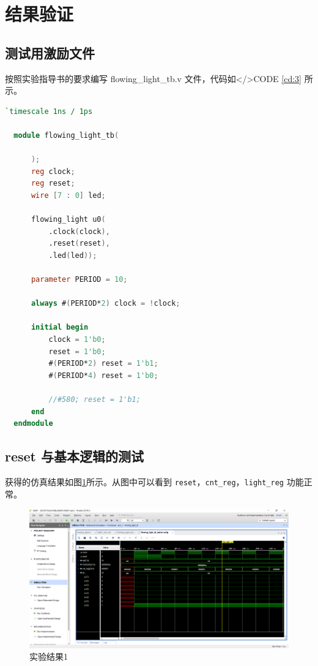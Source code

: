 \documentclass{progartcn}
\begin{document}
\section{结果验证}

\subsection{测试用激励文件}

按照实验指导书的要求编写 flowing\_light\_tb.v 文件，代码如</>CODE \ref{cd:3} 所示。

\begin{lstlisting}[language=verilog,caption={flowing\_light\_tb.v},label={cd:2}]
  `timescale 1ns / 1ps

  module flowing_light_tb(
  
      );
      reg clock;
      reg reset;
      wire [7 : 0] led;
      
      flowing_light u0(
          .clock(clock),
          .reset(reset),
          .led(led));
      
      parameter PERIOD = 10;
      
      always #(PERIOD*2) clock = !clock;
      
      initial begin
          clock = 1'b0;
          reset = 1'b0;
          #(PERIOD*2) reset = 1'b1;
          #(PERIOD*4) reset = 1'b0;
          
          //#580; reset = 1'b1;
      end
  endmodule
\end{lstlisting}

\subsection{reset 与基本逻辑的测试}

获得的仿真结果如图\ref{fig:1}所示。从图中可以看到 \verb|reset|，\verb|cnt_reg|，\verb|light_reg| 功能正常。

\begin{figure}[htbp]
  \centering
  \includegraphics[scale=0.3]{../figure/01/lab01-1.PNG}
  \caption{实验结果1}\label{fig:1}
\end{figure}
\end{document}
